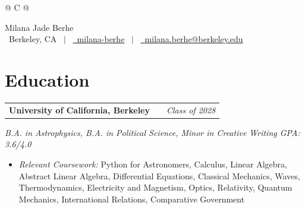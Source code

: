 \documentclass[a4paper,12pt]{article}
\makeatletter
\newenvironment{jobshort}[2]
    {
    \begin{tabularx}{\linewidth}{@{}l X r@{}}
    \textbf{#1} & \hfill &  #2 \\[3.75pt]
    \end{tabularx}
    }
    {
    }
\makeatother
\begin{document}
\pagestyle{empty} 



\begin{tabularx}{\linewidth}{@{} C @{}}

\Huge{Milana Jade Berhe} \\[4.5pt]

\raisebox{-0.05\height}\faMapMarker\ Berkeley, CA
\ $|$ \
\href{https://linkedin.com/in/milana-berhe}
{\raisebox{-0.05\height}\faLinkedin\ milana-berhe}
\ $|$ \
\href{mailto:milana.berhe@berkeley.edu}
{\raisebox{-0.05\height}\faEnvelope\ milana.berhe@berkeley.edu}

\end{tabularx}


\section{Education}

\begin{jobshort}{University of California, Berkeley}{\textit{Class of 2028}}
\textit {B.A. in Astrophysics, B.A. in Political Science, Minor in Creative Writing \hfill GPA: 3.6/4.0}

\begin{itemize}[nosep, leftmargin=1em, itemsep=3pt, label=\textopenbullet]
    \item \textit{Relevant Coursework:} Python for Astronomers, Calculus, Linear Algebra, Abstract Linear Algebra, Differential Equations, Classical Mechanics, Waves, Thermodynamics, Electricity and Magnetism, Optics, Relativity, Quantum Mechanics, International Relations, Comparative Government
\end{itemize}

\end{jobshort}
\end{document}
